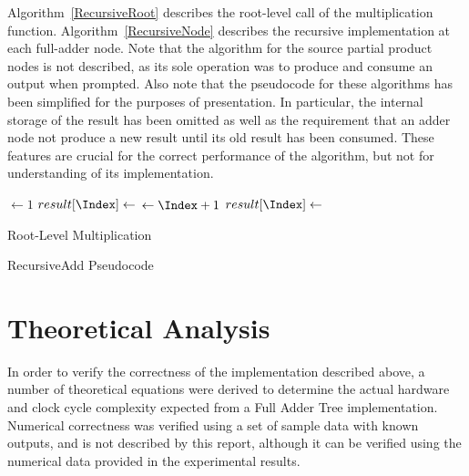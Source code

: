 \documentclass{article}
\begin{document}
Algorithm~\ref{RecursiveRoot} describes the root-level call of the multiplication function. Algorithm~\ref{RecursiveNode} describes the recursive implementation at each full-adder node. Note that the algorithm for the source partial product nodes is not described, as its sole operation was to produce and consume an output when prompted. Also note that the pseudocode for these algorithms has been simplified for the purposes of presentation. In particular, the internal storage of the result has been omitted as well as the requirement that an adder node not produce a new result until its old result has been consumed. These features are crucial for the correct performance of the algorithm, but not for understanding of its implementation.

\begin{algorithm}[h]
		
	
	\BlankLine
	\Index $\leftarrow 1$\;
	{
		{
			$result[\Index] \leftarrow$ \;
			\Index $\leftarrow \Index+1$\;
		}
	}
	$result[\Index] \leftarrow$ \;
	\caption{Root-Level Multiplication}
	\label{RecursiveRoot}
\end{algorithm}

\begin{algorithm}[h]
	
	
	\BlankLine	\If{\Result{\Left} \And \Result{\Right}}
	{
		\;
		\Notify{}\;
	}
	\RecAdd{\Left}\;
	\RecAdd{\Right}\;
	\caption{RecursiveAdd Pseudocode}
	\label{RecursiveNode}
\end{algorithm}

\section{Theoretical Analysis}
In order to verify the correctness of the implementation described above, a number of theoretical equations were derived to determine the actual hardware and clock cycle complexity expected from a Full Adder Tree implementation. Numerical correctness was verified using a set of sample data with known outputs, and is not described by this report, although it can be verified using the numerical data provided in the experimental results.
\end{document}
